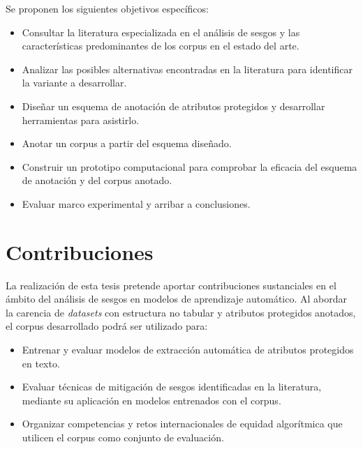 Se proponen los siguientes objetivos espec\'ificos:
\begin{itemize}
    \item Consultar la literatura especializada en el an\'alisis de sesgos y las caracter\'isticas predominantes de los corpus en el estado del arte.
    \item Analizar las posibles alternativas encontradas en la literatura para identificar la variante a desarrollar.
    \item Dise\~nar un esquema de anotaci\'on de atributos protegidos y desarrollar herramientas para asistirlo.
    \item Anotar un corpus a partir del esquema dise\~nado.
    \item Construir un prototipo computacional para comprobar la eficacia del esquema de anotaci\'on y del corpus anotado.
    \item Evaluar marco experimental y arribar a conclusiones.
\end{itemize}

\section*{Contribuciones}
La realizaci\'on de esta tesis pretende aportar contribuciones sustanciales en el \'ambito del an\'alisis de sesgos en modelos de aprendizaje 
autom\'atico. Al abordar la carencia de \emph{datasets} con estructura no tabular y atributos protegidos anotados, el corpus 
desarrollado podr\'a ser utilizado para:
\begin{itemize}
    \item Entrenar y evaluar modelos de extracci\'on autom\'atica de atributos protegidos en texto.
    \item Evaluar t\'ecnicas de mitigaci\'on de sesgos identificadas en la literatura, mediante su aplicaci\'on en 
    modelos entrenados con el corpus.
    \item Organizar competencias y retos internacionales de equidad algor\'itmica que utilicen el corpus como conjunto de evaluaci\'on.
\end{itemize}



